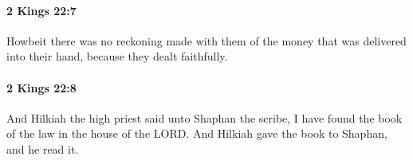 		\paragraph{2 Kings 22:7} %
			\label{2KINGS-22-7}

			Howbeit there was no reckoning made with them of the money that was delivered into their hand, because they dealt faithfully.


		\paragraph{2 Kings 22:8} %
			\label{2KINGS-22-8}

			And Hilkiah the high priest said unto Shaphan the scribe, I have found the book of the law in the house of the LORD. And Hilkiah gave the book to Shaphan, and he read it.


